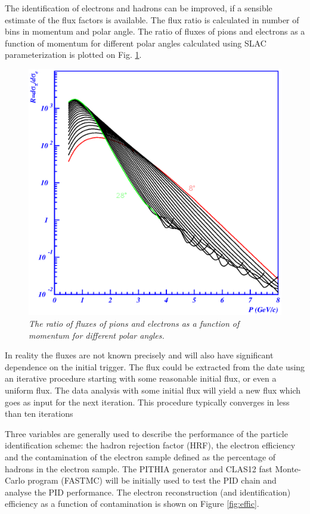 The identification of electrons and hadrons  can be improved, if a sensible estimate 
of the flux factors is available. The flux ratio is calculated in number of bins in 
momentum and polar angle. The ratio of fluxes of pions and electrons as a function of momentum 
for different polar angles calculated using SLAC parameterization \cite{SLAC} 
is plotted on Fig. \ref{fig:flux}.

\begin{figure}[htb]
  \centering
   \includegraphics[width=6in]{pid/pi_e_csratio.eps}
\caption{\it The ratio of fluxes of pions and electrons as a function of momentum 
for different polar angles.
}
\label{fig:flux}
\end{figure}

In reality the fluxes are not known precisely and will also have significant dependence
on the initial trigger. The flux could be extracted from the date using an iterative
procedure starting with some reasonable initial flux, or even a uniform flux. The data
analysis with some initial flux will yield a new flux which goes as input for the next
iteration. This procedure typically converges in less than ten iterations \cite{HERMES,HERMES1}

Three variables are generally used to describe the performance of the particle 
identification scheme: the hadron rejection factor (HRF), the electron efficiency 
and the contamination of the
electron sample defined as the percentage of hadrons in the electron sample.
The PITHIA generator and CLAS12 fast Monte-Carlo program (FASTMC) will be initially 
used to test the PID chain and analyse the PID performance.
The electron reconstruction (and identification) efficiency as a function
of contamination is shown on Figure \ref{fig:effic}.

